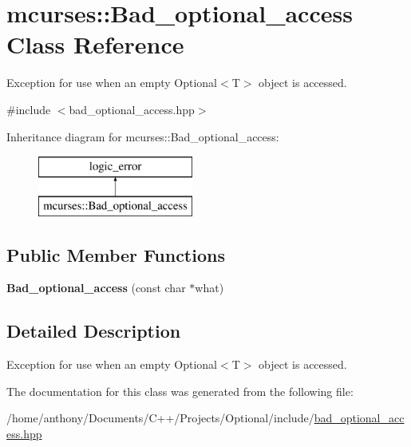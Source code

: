 \hypertarget{classmcurses_1_1Bad__optional__access}{}\section{mcurses\+:\+:Bad\+\_\+optional\+\_\+access Class Reference}
\label{classmcurses_1_1Bad__optional__access}


Exception for use when an empty Optional$<$\+T$>$ object is accessed.  




{\ttfamily \#include $<$bad\+\_\+optional\+\_\+access.\+hpp$>$}

Inheritance diagram for mcurses\+:\+:Bad\+\_\+optional\+\_\+access\+:\begin{figure}[H]
\begin{center}
\leavevmode
\includegraphics[height=2.000000cm]{classmcurses_1_1Bad__optional__access}
\end{center}
\end{figure}
\subsection*{Public Member Functions}
\begin{DoxyCompactItemize}
\item 
\hypertarget{classmcurses_1_1Bad__optional__access_a5245b58b8e10e7528fd5331b6af38be5}{}\label{classmcurses_1_1Bad__optional__access_a5245b58b8e10e7528fd5331b6af38be5} 
{\bfseries Bad\+\_\+optional\+\_\+access} (const char $\ast$what)
\end{DoxyCompactItemize}


\subsection{Detailed Description}
Exception for use when an empty Optional$<$\+T$>$ object is accessed. 

The documentation for this class was generated from the following file\+:\begin{DoxyCompactItemize}
\item 
/home/anthony/\+Documents/\+C++/\+Projects/\+Optional/include/\hyperlink{bad__optional__access_8hpp}{bad\+\_\+optional\+\_\+access.\+hpp}\end{DoxyCompactItemize}
